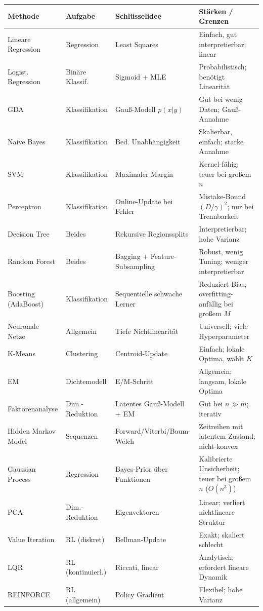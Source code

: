 \documentclass[11pt]{article}
\theoremstyle{csthm}
\theoremstyle{csdef}
\begin{document}
\begin{center}
\begin{tabular}{p{3.2cm} p{3cm} p{3.2cm} p{4.5cm}}
\toprule
\textbf{Methode} & \textbf{Aufgabe} & \textbf{Schlüsselidee} & \textbf{Stärken / Grenzen} \\
\midrule
Lineare Regression & Regression & Least Squares & Einfach, gut interpretierbar; linear \\
Logist. Regression & Binäre Klassif. & Sigmoid + MLE & Probabilistisch; benötigt Linearität \\
GDA & Klassifikation & Gauß-Modell $p(x|y)$ & Gut bei wenig Daten; Gauß-Annahme \\
Naive Bayes & Klassifikation & Bed. Unabhängigkeit & Skalierbar, einfach; starke Annahme \\
SVM & Klassifikation & Maximaler Margin & Kernel-fähig; teuer bei großem $n$ \\
Perceptron & Klassifikation & Online-Update bei Fehler & Mistake-Bound $(D/\gamma)^2$; nur bei Trennbarkeit \\
Decision Tree & Beides & Rekursive Regionssplits & Interpretierbar; hohe Varianz \\
Random Forest & Beides & Bagging + Feature-Subsampling & Robust, wenig Tuning; weniger interpretierbar \\
Boosting (AdaBoost) & Klassifikation & Sequentielle schwache Lerner & Reduziert Bias; overfitting-anfällig bei großem $M$ \\
Neuronale Netze & Allgemein & Tiefe Nichtlinearität & Universell; viele Hyperparameter \\
K-Means & Clustering & Centroid-Update & Einfach; lokale Optima, wählt $K$ \\
EM & Dichtemodell & E/M-Schritt & Allgemein; langsam, lokale Optima \\
Faktorenanalyse & Dim.-Reduktion & Latentes Gauß-Modell + EM & Gut bei $n \gg m$; iterativ \\
Hidden Markov Model & Sequenzen & Forward/Viterbi/Baum-Welch & Zeitreihen mit latentem Zustand; nicht-konvex \\
Gaussian Process & Regression & Bayes-Prior über Funktionen & Kalibrierte Unsicherheit; teuer bei großem $n$ ($O(n^3)$) \\
PCA & Dim.-Reduktion & Eigenvektoren & Linear; verliert nichtlineare Struktur \\
Value Iteration & RL (diskret) & Bellman-Update & Exakt; skaliert schlecht \\
LQR & RL (kontinuierl.) & Riccati, linear & Analytisch; erfordert lineare Dynamik \\
REINFORCE & RL (allgemein) & Policy Gradient & Flexibel; hohe Varianz \\
\bottomrule
\end{tabular}
\end{center}
\end{document}
